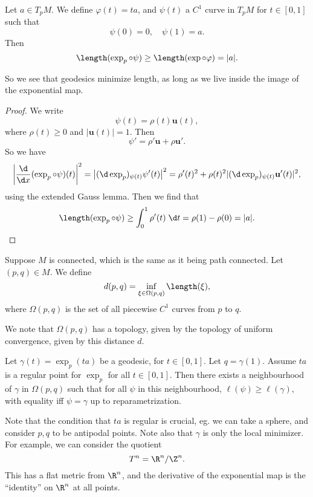 \documentclass[a4paper]{article}
\begin{document}
\begin{cor}
  Let $a \in T_p M$. We define $\varphi(t) = ta$, and $\psi(t)$ a $C^1$ curve in $T_p M$ for $t \in [0, 1]$ such that
  \[
    \psi(0) = 0,\quad \psi(1) = a.
  \]
  Then
  \[
    \length(\exp_p \circ \psi) \geq \length(\exp \circ \varphi) = |a|.
  \]
\end{cor}
So we see that geodesics minimize length, as long as we live inside the image of the exponential map.
\begin{proof}
  We write
  \[
    \psi(t) = \rho(t) \mathbf{u}(t),
  \]
  where $\rho(t) \geq 0$ and $|\mathbf{u}(t)| = 1$. Then
  \[
    \psi' = \rho' \mathbf{u} + \rho \mathbf{u}'.
  \]
  So we have
  \[
    \left|\frac{\d}{\d x} (\exp_p \circ \psi) (t)\right|^2 = \left|(\d \exp_p)_{\psi(t)} \psi'(t) \right|^2 = \rho'(t)^2 + \rho(t)^2 |(\d \exp_p)_{\psi(t)} \mathbf{u}'(t)|^2,
  \]
  using the extended Gauss lemma. Then we find that
  \[
    \length(\exp_p \circ \psi) \geq \int_0^1 \rho'(t) \;\d t = \rho(1) - \rho(0) = |a|.
  \]
\end{proof}

\begin{defi}[Distance]
  Suppose $M$ is connected, which is the same as it being path connected. Let $(p, q) \in M$. We define
  \[
    d(p, q) = \inf_{\xi \in \Omega(p, q)} \length(\xi),
  \]
  where $\Omega(p, q)$ is the set of all piecewise $C^1$ curves from $p$ to $q$.
\end{defi}

We note that $\Omega(p, q)$ has a topology, given by the topology of uniform convergence, given by this distance $d$.

\begin{thm}
  Let $\gamma(t) = \exp_p(ta)$ be a geodesic, for $t \in [0, 1]$. Let $q = \gamma(1)$. Assume $ta$ is a regular point for $\exp_p$ for all $t \in [0, 1]$. Then there exists a neighbourhood of $\gamma$ in $\Omega(p, q)$ such that for all $\psi$ in this neighbourhood, $\ell(\psi) \geq \ell(\gamma)$, with equality iff $\psi = \gamma$ up to reparametrization.
\end{thm}
Note that the condition that $ta$ is regular is crucial, eg. we can take a sphere, and consider $p, q$ to be antipodal points. Note also that $\gamma$ is only the local minimizer. For example, we can consider the quotient
\[
  T^n = \R^n/\Z^n.
\]
This has a flat metric from $\R^n$, and the derivative of the exponential map is the ``identity'' on $\R^n$ at all points.
\end{document}
